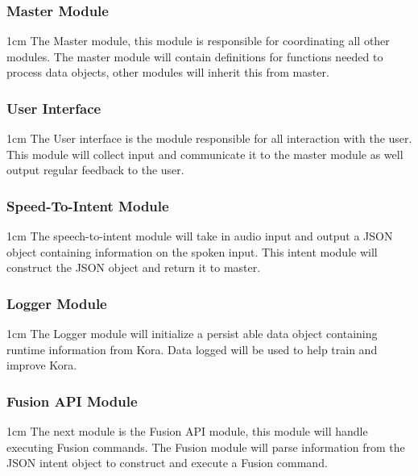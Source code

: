 \documentclass[onecolumn, draftclsnofoot,10pt, compsoc]{IEEEtran}
\def \botname{Kora\xspace}
\newenvironment{indentItem}[1][1cm]{\begin{adjustwidth}{#1}{}}{\end{adjustwidth}}
\begin{document}
		\subsubsection{Master Module}
			\begin{indentItem}
				The Master module, this module is responsible for coordinating all other modules.
				The master module will contain definitions for functions needed to process data objects, other modules will inherit this from master.
			\end{indentItem}
		\subsubsection{User Interface}
			\begin{indentItem}
				The User interface is the module responsible for all interaction with the user.
				This module will collect input and communicate it to the master module as well output regular feedback to the user.
			\end{indentItem}
		\subsubsection{Speed-To-Intent Module}
			\begin{indentItem}
				The speech-to-intent module will take in audio input and output a JSON object containing information on the spoken input.
				This intent module will construct the JSON object and return it to master.
			\end{indentItem}
		\subsubsection{Logger Module}
			\begin{indentItem}
				The Logger module will initialize a persist able data object containing runtime information from \botname.
				Data logged will be used to help train and improve \botname.
			\end{indentItem}
		\subsubsection{Fusion API Module}
			\begin{indentItem}
				The next module is the Fusion API module, this module will handle executing Fusion commands.
				The Fusion module will parse information from the JSON intent object to construct and execute a Fusion command.
			\end{indentItem}
\end{document}
